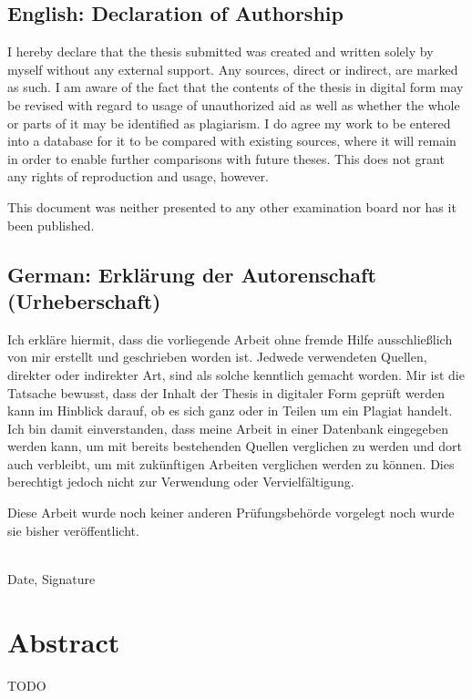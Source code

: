 \documentclass[a4paper, 11pt, oneside]{article}
\theoremstyle{definition}
\begin{document}
\subsection*{English: Declaration of Authorship}

I hereby declare that the thesis submitted was created and written solely by
myself without any external support. Any sources, direct or indirect, are marked
as such. I am aware of the fact that the contents of the thesis in digital
form may be revised with regard to usage of unauthorized aid as well as
whether the whole or parts of it may be identified as plagiarism. I do agree my
work to be entered into a database for it to be compared with existing sources,
where it will remain in order to enable further comparisons with future theses.
This does not grant any rights of reproduction and usage, however.

This document was neither presented to any other examination board nor has it
been published.

\subsection*{German: Erklärung der Autorenschaft (Urheberschaft)}

Ich erkläre hiermit, dass die vorliegende Arbeit ohne fremde Hilfe
ausschließlich von mir erstellt und geschrieben worden ist. Jedwede verwendeten
Quellen, direkter oder indirekter Art, sind als solche kenntlich gemacht worden.
Mir ist die Tatsache bewusst, dass der Inhalt der Thesis in digitaler Form geprüft
werden kann im Hinblick darauf, ob es sich ganz oder in Teilen um ein Plagiat
handelt. Ich bin damit einverstanden, dass meine Arbeit in einer Datenbank
eingegeben werden kann, um mit bereits bestehenden Quellen verglichen zu werden
und dort auch verbleibt, um mit zukünftigen Arbeiten verglichen werden zu
können. Dies berechtigt jedoch nicht zur Verwendung oder Vervielfältigung.

Diese Arbeit wurde noch keiner anderen Prüfungsbehörde vorgelegt noch wurde sie
bisher veröffentlicht.

\vspace{20mm}

\dotfill\\ Date, Signature

\newpage

\section*{Abstract}
TODO
\end{document}
